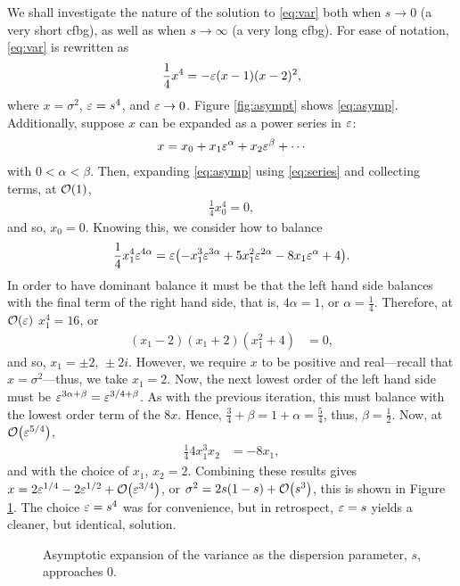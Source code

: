 We shall investigate the nature of the solution to \eqref{eq:var} both when $s \rightarrow 0$ (a very short \gls{cfbg}), as well as when $s \rightarrow \infty$ (a very long \gls{cfbg}). For ease of notation, \eqref{eq:var} is rewritten as
\begin{align}
\label{eq:asymp}
\frac{1}{4} x^4 = - \varepsilon (x - 1)(x - 2)^2,
\end{align}
where $x = \sigma^2$, $\varepsilon = s^4$, and $\varepsilon \rightarrow 0$. Figure \ref{fig:asympt} shows \eqref{eq:asymp}. Additionally, suppose $x$ can be expanded as a power series in $\varepsilon$:
\begin{align}
\label{eq:series}
x = x_0 + x_1 \varepsilon^\alpha + x_2 \varepsilon^\beta + \cdots
\end{align}
with $0 < \alpha < \beta$. Then, expanding \eqref{eq:asymp} using \eqref{eq:series} and collecting terms, at $\bigO{1}$,
\begin{align*}
\frac{1}{4} x_0^4 = 0,
\end{align*}
and so, $x_0 = 0$. Knowing this, we consider how to balance
\begin{align*}
\frac{1}{4} x_1^4 \eps^{4\alpha} = \eps \left( -x_1^3 \eps^{3\alpha} + 5x_1^2 \eps^{2\alpha} - 8x_1 \eps^\alpha + 4 \right).
\end{align*}
In order to have dominant balance it must be that the left hand side balances with the final term of the right hand side, that is, $4\alpha = 1$, or $\alpha = \frac{1}{4}$. Therefore, at $\bigO{\eps}$ $x_1^4 = 16$, or
\begin{align*}
(x_1 - 2)(x_1 + 2)(x_1^2 + 4) &= 0,
\end{align*}
and so, $x_1 = \pm 2, \, \pm 2 i$. However, we require $x$ to be positive and real---recall that $x = \sigma^2$---thus, we take $x_1 = 2$. Now, the next lowest order of the left hand side must be $\varepsilon^{3\alpha + \beta} = \varepsilon^{3/4 + \beta}$. As with the previous iteration, this must balance with the lowest order term of the $8x$. Hence, $\frac{3}{4} + \beta = 1 + \alpha = \frac{5}{4}$, thus, $\beta = \frac{1}{2}$. Now, at $\bigO{\eps^{5/4}}$,
\begin{align*}
\frac{1}{4} 4 x_1^3 x_2 &= -8x_1,
\end{align*}
and with the choice of $x_1$, $x_2 = 2$. Combining these results gives $x = 2 \eps^{1/4} - 2 \eps^{1/2} + \bigO{\eps^{3/4}}$, or $\sigma^2 = 2 s \left( 1 - s \right) + \bigO{s^3}$,
this is shown in Figure \ref{fig:lims0}. The choice $\varepsilon = s^4$ was for convenience, but in retrospect, $\varepsilon = s$ yields a cleaner, but identical, solution. \\
\begin{figure}[tbp]

\caption[Asymptotic expansion of the variance as the dispersion parameter approaches 0.]{Asymptotic expansion of the variance as the dispersion parameter, $s$, approaches $0$.}
\label{fig:lims0}
\end{figure}

